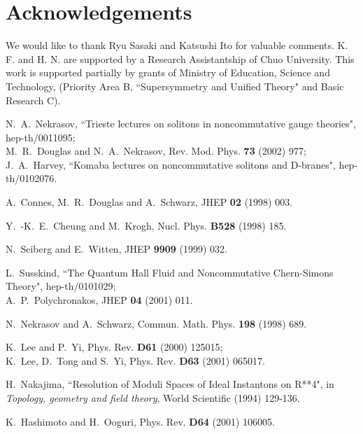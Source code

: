 \documentclass[a4paper,12pt]{article}
\begin{document}

\section*{Acknowledgements}
We would like to thank Ryu Sasaki and Katsushi Ito 
for valuable comments. 
K. F. and H. N. are supported by a Research 
Assistantship of Chuo University. This work is supported 
partially by grants of Ministry of Education, 
Science and Technology, (Priority Area B, ``Supersymmetry and 
Unified Theory" and Basic Research C). 




\begin{thebibliography}{99}

N.~A.~Nekrasov,
``Trieste lectures on solitons in noncommutative gauge theories",
hep-th/0011095; \\
M.~R.~Douglas and N.~A.~Nekrasov,
Rev. Mod. Phys. {\bf 73} (2002) 977; \\
J.~A.~Harvey,
``Komaba lectures on noncommutative solitons and D-branes",
hep-th/0102076.

A.~Connes, M.~R.~Douglas and A.~Schwarz, JHEP {\bf 02} (1998) 003.

Y.~-K.~E.~Cheung and M.~Krogh, Nucl. Phys. {\bf B528} (1998) 185.

N.~Seiberg and E.~Witten, JHEP {\bf 9909} (1999) 032.

L.~Susskind, ``The Quantum Hall Fluid and Noncommutative Chern-Simons Theory", 
hep-th/0101029; \\
A.~P.~Polychronakos, JHEP {\bf 04} (2001) 011.  

N.~Nekrasov and A.~Schwarz, Commun. Math. Phys. {\bf 198} (1998) 689.

K.~Lee and P.~Yi, Phys. Rev. {\bf D61} (2000) 125015; \\
K.~Lee, D.~Tong and S.~Yi, Phys. Rev. {\bf D63} (2001) 065017.

H.~Nakajima, ``Resolution of Moduli Spaces of Ideal Instantons on R**4",
in {\it Topology, geometry and field theory}, World Scientific (1994) 129-136.

K.~Hashimoto and H.~Ooguri, Phys. Rev. {\bf D64} (2001) 106005.
\fi


\end{thebibliography}
\end{document}
